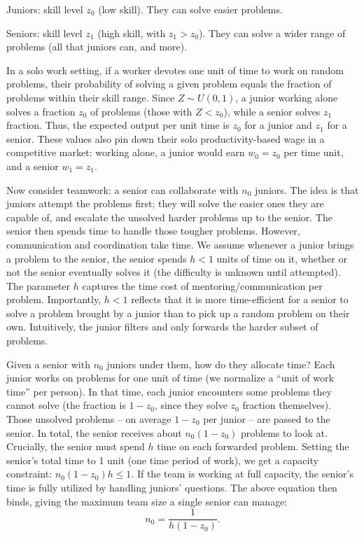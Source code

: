 \documentclass[12pt]{article}
\begin{document}
{Juniors:} skill level \(z_0\) (low skill). They can solve
easier problems.

{Seniors:} skill level \(z_1\) (high skill, with
\(z_1 > z_0\)). They can solve a wider range of problems (all that
juniors can, and more).

In a {solo work} setting, if a worker devotes one unit of time to
work on random problems, their probability of solving a given problem
equals the fraction of problems within their skill range. Since
\(Z \sim U(0,1)\), a junior working alone solves a fraction \(z_0\) of
problems (those with \(Z < z_0\)), while a senior solves \(z_1\)
fraction. Thus, the {expected output per unit time} is \(z_0\)
for a junior and \(z_1\) for a senior. These values also pin down their
{solo productivity-based wage} in a competitive market: working
alone, a junior would earn \(w_0 = z_0\) per time unit, and a senior
\(w_1 = z_1\).

Now consider {teamwork:} a senior can collaborate with \(n_0\)
juniors. The idea is that juniors attempt the problems first; they will
solve the easier ones they are capable of, and {escalate the
unsolved harder problems up to the senior}. The senior then spends time
to handle those tougher problems. However, communication and
coordination take time. We assume {whenever a junior brings a
problem to the senior, the senior spends \(h < 1\) units of time on it},
whether or not the senior eventually solves it (the difficulty is
unknown until attempted). The parameter \(h\) captures the {time
cost of mentoring/communication per problem}. Importantly, \(h<1\)
reflects that it is more {time-efficient for a senior to solve a
problem brought by a junior} than to pick up a random problem on their
own. Intuitively, the junior filters and only forwards the harder subset
of problems.

Given a senior with \(n_0\) juniors under them, how do they allocate
time? Each junior works on problems for one unit of time (we normalize a
``unit of work time'' per person). In that time, each junior encounters
some problems they cannot solve (the fraction is \(1 - z_0\), since they
solve \(z_0\) fraction themselves). Those unsolved problems -- on
average \(1-z_0\) per junior -- are passed to the senior. In total, the
senior receives about \(n_0 (1 - z_0)\) problems to look at.
{Crucially, the senior must spend \(h\) time on each forwarded
problem.} Setting the senior's total time to 1 unit (one time period of
work), we get a capacity constraint: \(n_0 (1 - z_0) h \le 1.\) If the
team is working at full capacity, the senior's time is fully utilized by
handling juniors' questions. The above equation then binds, giving the
{maximum team size} a single senior can manage: 
\begin{equation}
n_0 =
\frac{1}{h(1 - z_0)}. \tag{1}
\end{equation}
\end{document}
